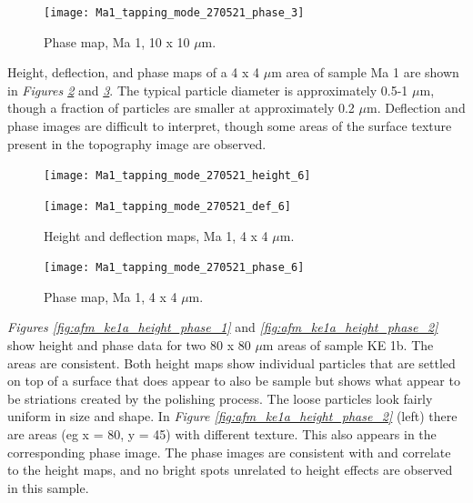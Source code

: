 \begin{figure}[H]
\centering
  \texttt{[image: Ma1\_tapping\_mode\_270521\_phase\_3]}
\caption[Phase map, Ma 1]{Phase map, Ma 1, 10 x 10 $\mu$m.}
\label{fig:afm_ma1_phase_4}
\end{figure}

Height, deflection, and phase maps of a 4 x 4 $\mu$m area of sample Ma 1 are shown in \textit{Figures \ref{fig:afm_ma1_height_def_5}} and \textit{\ref{fig:afm_ma1_phase_5}}. The typical particle diameter is approximately 0.5-1 $\mu$m, though a fraction of particles are smaller at approximately 0.2 $\mu$m. Deflection and phase images are difficult to interpret, though some areas of the surface texture present in the topography image are observed.

\begin{figure}[H]
\centering
\begin{minipage}{.45\textwidth}
  \centering
  \texttt{[image: Ma1\_tapping\_mode\_270521\_height\_6]}
\end{minipage}
\begin{minipage}{.45\textwidth}
  \centering
  \texttt{[image: Ma1\_tapping\_mode\_270521\_def\_6]}
\end{minipage}
\caption[Height and deflection maps, Ma 1]{Height and deflection maps, Ma 1, 4 x 4 $\mu$m.}
\label{fig:afm_ma1_height_def_5}
\end{figure}

\begin{figure}[H]
\centering
  \texttt{[image: Ma1\_tapping\_mode\_270521\_phase\_6]}
\caption[Phase map, Ma 1]{Phase map, Ma 1, 4 x 4 $\mu$m.}
\label{fig:afm_ma1_phase_5}
\end{figure}



\textit{Figures \ref{fig:afm_ke1a_height_phase_1}} and \textit{\ref{fig:afm_ke1a_height_phase_2}} show height and phase data for two 80 x 80 $\mu$m areas of sample KE 1b. The areas are consistent. Both height maps show individual particles that are settled on top of a surface that does appear to also be sample but shows what appear to be striations created by the polishing process. The loose particles look fairly uniform in size and shape. In \textit{Figure \ref{fig:afm_ke1a_height_phase_2}} (left) there are areas (eg x = 80, y = 45) with different texture. This also appears in the corresponding phase image. The phase images are consistent with and correlate to the height maps, and no bright spots unrelated to height effects are observed in this sample.


